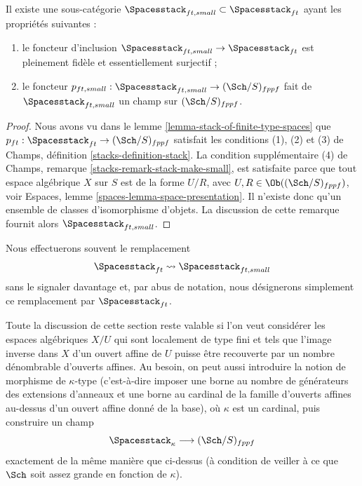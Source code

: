 \begin{lemma}
\label{lemma-stack-ft-spaces}
Il existe une sous-catégorie
$\Spacesstack_{ft, small} \subset \Spacesstack_{ft}$
ayant les propriétés suivantes :
\begin{enumerate}
\item le foncteur d'inclusion
$\Spacesstack_{ft, small} \to \Spacesstack_{ft}$ est
pleinement fidèle et essentiellement surjectif ;
\item le foncteur
$p_{ft, small} : \Spacesstack_{ft, small} \to (\Sch/S)_{fppf}$
fait de $\Spacesstack_{ft, small}$ un champ sur
$(\Sch/S)_{fppf}$.
\end{enumerate}
\end{lemma}

\begin{proof}
Nous avons vu dans le
lemme \ref{lemma-stack-of-finite-type-spaces}
que $p_{ft} : \Spacesstack_{ft} \to (\Sch/S)_{fppf}$
satisfait les conditions (1), (2) et (3) de
Champs, définition \ref{stacks-definition-stack}.
La condition supplémentaire (4) de
Champs, remarque \ref{stacks-remark-stack-make-small},
est satisfaite parce que tout espace algébrique $X$ sur $S$ est de la
forme $U/R$, avec $U, R \in \Ob((\Sch/S)_{fppf})$, voir
Espaces, lemme \ref{spaces-lemma-space-presentation}.
Il n'existe donc qu'un ensemble de classes d'isomorphisme d'objets.
La discussion de cette remarque fournit alors $\Spacesstack_{ft, small}$.
\end{proof}

\noindent
Nous effectuerons souvent le remplacement
$$
\Spacesstack_{ft} \leadsto \Spacesstack_{ft, small}
$$
sans le signaler davantage et, par abus de notation, nous désignerons
simplement ce remplacement par $\Spacesstack_{ft}$.

\begin{remark}
\label{remark-higher-cardinality-spaces}
Toute la discussion de cette section reste valable
si l'on veut considérer les espaces algébriques $X/U$ qui sont
localement de type fini et tels que l'image inverse dans $X$ d'un ouvert affine
de $U$ puisse être recouverte par un nombre dénombrable d'ouverts affines.
Au besoin, on peut aussi introduire la notion de morphisme de
$\kappa$-type (c'est-à-dire imposer une borne au nombre de générateurs des
extensions d'anneaux et une borne au cardinal de la famille d'ouverts affines au-dessus
d'un ouvert affine donné de la base), où $\kappa$ est un cardinal, puis
construire un champ
$$
\Spacesstack_\kappa \longrightarrow (\Sch/S)_{fppf}
$$
exactement de la même manière que ci-dessus (à condition de veiller à ce que
$\Sch$ soit assez grande en fonction de $\kappa$).
\end{remark}





